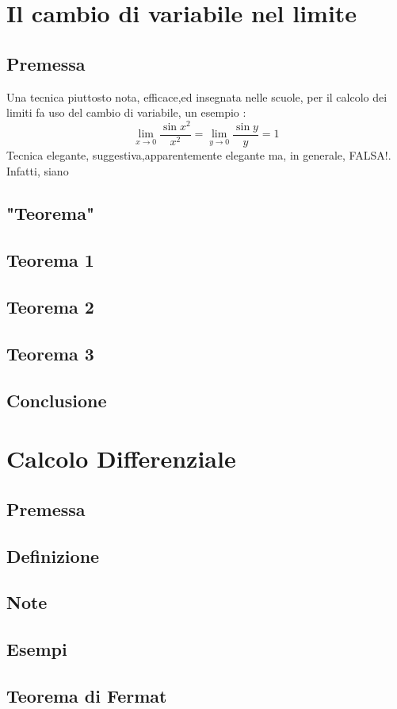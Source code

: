 \documentclass[fontsize = 20px, paper = a4]{article}
\begin{document}
\section{Il cambio di variabile nel limite}
\subsection{Premessa}
Una tecnica piuttosto nota, efficace,ed insegnata nelle scuole, per il calcolo dei limiti fa uso del cambio di variabile, un esempio :
$$\lim_{x \to 0} \frac{\sin x^2}{x^2} = \lim_{y \to 0}\frac{\sin y}{y} = 1$$
Tecnica elegante, suggestiva,apparentemente elegante ma, in generale, FALSA!. Infatti, siano
\subsection{"Teorema"}
\subsection*{Teorema 1}
\subsection{Teorema 2}
\subsection{Teorema 3}
\subsection{Conclusione}
\section{Calcolo Differenziale}
\subsection{Premessa}
\subsection{Definizione}
\subsection{Note}
\subsection{Esempi}
\subsection{Teorema di Fermat}
\end{document}
